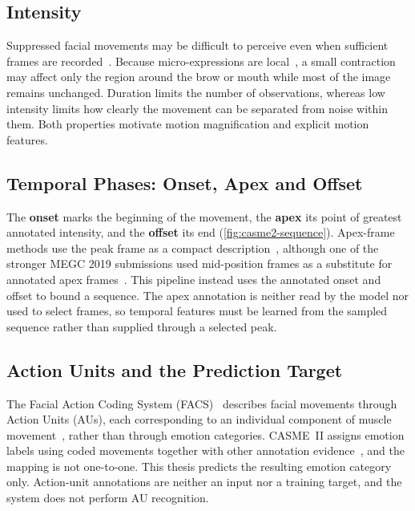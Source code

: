 \subsection{Intensity}
\label{sec:low-intensity}

Suppressed facial movements may be difficult to perceive even when sufficient frames are recorded~\cite{yan2014}. Because micro-expressions are local~\cite{ben2021}, a small contraction may affect only the region around the brow or mouth while most of the image remains unchanged. Duration limits the number of observations, whereas low intensity limits how clearly the movement can be separated from noise within them. Both properties motivate motion magnification and explicit motion features.

\subsection{Temporal Phases: Onset, Apex and Offset}
\label{sec:onset-apex-offset}

The \textbf{onset} marks the beginning of the movement, the \textbf{apex} its point of greatest annotated intensity, and the \textbf{offset} its end (\autoref{fig:casme2-sequence}). Apex-frame methods use the peak frame as a compact description~\cite{liY2018}, although one of the stronger MEGC 2019 submissions used mid-position frames as a substitute for annotated apex frames~\cite{see2019}. This pipeline instead uses the annotated onset and offset to bound a sequence. The apex annotation is neither read by the model nor used to select frames, so temporal features must be learned from the sampled sequence rather than supplied through a selected peak.

\subsection{Action Units and the Prediction Target}
\label{sec:action-units}

The Facial Action Coding System (FACS)~\cite{ekman1978} describes facial movements through Action Units (AUs), each corresponding to an individual component of muscle movement~\cite{li2022survey}, rather than through emotion categories. CASME~II assigns emotion labels using coded movements together with other annotation evidence~\cite{yan2014}, and the mapping is not one-to-one. This thesis predicts the resulting emotion category only. Action-unit annotations are neither an input nor a training target, and the system does not perform AU recognition.



